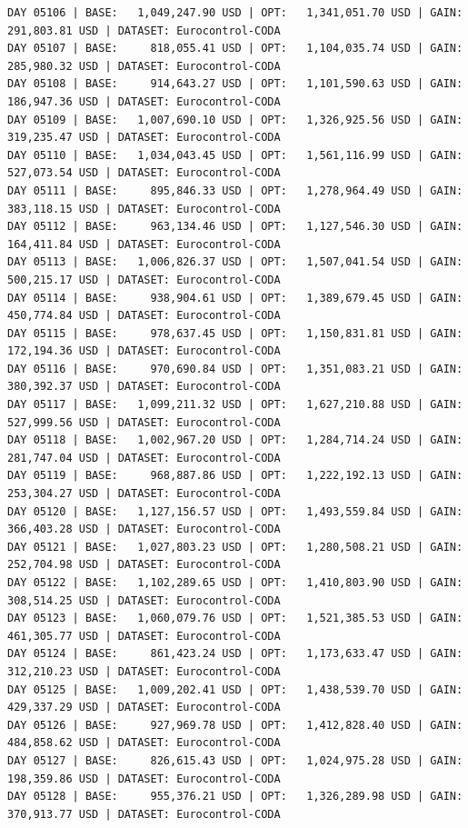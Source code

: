 \documentclass[11pt,a4paper]{article}
\begin{document}
\begin{verbatim}
DAY 05106 | BASE:   1,049,247.90 USD | OPT:   1,341,051.70 USD | GAIN: 291,803.81 USD | DATASET: Eurocontrol-CODA
DAY 05107 | BASE:     818,055.41 USD | OPT:   1,104,035.74 USD | GAIN: 285,980.32 USD | DATASET: Eurocontrol-CODA
DAY 05108 | BASE:     914,643.27 USD | OPT:   1,101,590.63 USD | GAIN: 186,947.36 USD | DATASET: Eurocontrol-CODA
DAY 05109 | BASE:   1,007,690.10 USD | OPT:   1,326,925.56 USD | GAIN: 319,235.47 USD | DATASET: Eurocontrol-CODA
DAY 05110 | BASE:   1,034,043.45 USD | OPT:   1,561,116.99 USD | GAIN: 527,073.54 USD | DATASET: Eurocontrol-CODA
DAY 05111 | BASE:     895,846.33 USD | OPT:   1,278,964.49 USD | GAIN: 383,118.15 USD | DATASET: Eurocontrol-CODA
DAY 05112 | BASE:     963,134.46 USD | OPT:   1,127,546.30 USD | GAIN: 164,411.84 USD | DATASET: Eurocontrol-CODA
DAY 05113 | BASE:   1,006,826.37 USD | OPT:   1,507,041.54 USD | GAIN: 500,215.17 USD | DATASET: Eurocontrol-CODA
DAY 05114 | BASE:     938,904.61 USD | OPT:   1,389,679.45 USD | GAIN: 450,774.84 USD | DATASET: Eurocontrol-CODA
DAY 05115 | BASE:     978,637.45 USD | OPT:   1,150,831.81 USD | GAIN: 172,194.36 USD | DATASET: Eurocontrol-CODA
DAY 05116 | BASE:     970,690.84 USD | OPT:   1,351,083.21 USD | GAIN: 380,392.37 USD | DATASET: Eurocontrol-CODA
DAY 05117 | BASE:   1,099,211.32 USD | OPT:   1,627,210.88 USD | GAIN: 527,999.56 USD | DATASET: Eurocontrol-CODA
DAY 05118 | BASE:   1,002,967.20 USD | OPT:   1,284,714.24 USD | GAIN: 281,747.04 USD | DATASET: Eurocontrol-CODA
DAY 05119 | BASE:     968,887.86 USD | OPT:   1,222,192.13 USD | GAIN: 253,304.27 USD | DATASET: Eurocontrol-CODA
DAY 05120 | BASE:   1,127,156.57 USD | OPT:   1,493,559.84 USD | GAIN: 366,403.28 USD | DATASET: Eurocontrol-CODA
DAY 05121 | BASE:   1,027,803.23 USD | OPT:   1,280,508.21 USD | GAIN: 252,704.98 USD | DATASET: Eurocontrol-CODA
DAY 05122 | BASE:   1,102,289.65 USD | OPT:   1,410,803.90 USD | GAIN: 308,514.25 USD | DATASET: Eurocontrol-CODA
DAY 05123 | BASE:   1,060,079.76 USD | OPT:   1,521,385.53 USD | GAIN: 461,305.77 USD | DATASET: Eurocontrol-CODA
DAY 05124 | BASE:     861,423.24 USD | OPT:   1,173,633.47 USD | GAIN: 312,210.23 USD | DATASET: Eurocontrol-CODA
DAY 05125 | BASE:   1,009,202.41 USD | OPT:   1,438,539.70 USD | GAIN: 429,337.29 USD | DATASET: Eurocontrol-CODA
DAY 05126 | BASE:     927,969.78 USD | OPT:   1,412,828.40 USD | GAIN: 484,858.62 USD | DATASET: Eurocontrol-CODA
DAY 05127 | BASE:     826,615.43 USD | OPT:   1,024,975.28 USD | GAIN: 198,359.86 USD | DATASET: Eurocontrol-CODA
DAY 05128 | BASE:     955,376.21 USD | OPT:   1,326,289.98 USD | GAIN: 370,913.77 USD | DATASET: Eurocontrol-CODA

\end{verbatim}
\end{document}
